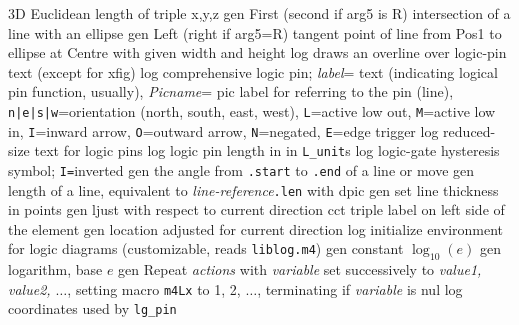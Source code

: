   {3D}
  {Euclidean length of triple x,y,z}
  {gen}
  { First (second if arg5 is R) intersection of a line with an ellipse}
  {gen}
  { Left (right if arg5=R) tangent point of line
     from Pos1 to ellipse at Centre with given width and height}
  {log}
  {draws an overline over logic-pin text (except for xfig)}
  {log}
  {comprehensive logic pin;
   {\sl label}= text (indicating logical pin function, usually),
   {\sl Picname}= pic label for referring to the pin (line),
   {\tt n|e|s|w}=orientation (north, south, east, west),
   {\tt L}=active low out,
   {\tt M}=active low in,
   {\tt I}=inward arrow,
   {\tt O}=outward arrow,
   {\tt N}=negated,
   {\tt E}=edge trigger}
  {log}
  {reduced-size text for logic pins}
  {log}
  {logic pin length in in {\tt L\_unit}s}
  {log}
  {logic-gate hysteresis symbol; {\tt I=}inverted}
  {gen}
  {the angle from {\tt .start} to {\tt .end} of a line or move}
  {gen}
  {length of a line, equivalent to {\sl line-reference}{\tt .len}
   with dpic}
  {gen}
  {set line thickness in points}
  {gen}
  {ljust with respect to current direction}
  {cct}
  {triple label on left side of the element }
  {gen}
  {location adjusted for current direction}
  {log}
  {initialize environment for logic diagrams
    (customizable, reads {\tt liblog.m4})}
  {gen}
  {constant $\log_{10}(e)$}
  {gen}
  {logarithm, base $e$}
  {gen}
  {Repeat {\sl actions} with {\sl variable} set successively to
   {\sl value1, value2, $\ldots$}, setting macro {\tt m4Lx} to 1, 2, $\ldots$,
   terminating if {\sl variable} is nul}
  {log}
  {coordinates used by {\tt lg\_pin}}
